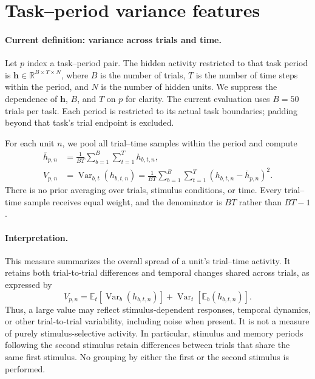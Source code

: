 \documentclass{article}
\begin{document}
\section{Task--period variance features}
\label{sec:task-period-variance}
\paragraph{Current definition: variance across trials and time.}
Let $p$ index a task--period pair. The hidden activity restricted to that
task period is $\mathbf{h}\in\mathbb{R}^{B\times T\times N}$, where $B$
is the number of trials, $T$ is the number of time steps within the period,
and $N$ is the number of hidden units. We suppress the dependence of
$\mathbf{h}$, $B$, and $T$ on $p$ for clarity. The current evaluation uses
$B=50$ trials per task. Each period is restricted to its actual task
boundaries; padding beyond that task's trial endpoint is excluded.

For each unit $n$, we pool all trial--time samples within the period and
compute
\begin{align}
    \bar{h}_{p,n}
    &= \frac{1}{BT}\sum_{b=1}^{B}\sum_{t=1}^{T}h_{b,t,n}, \\
    V_{p,n}
    &= \operatorname{Var}_{b,t}(h_{b,t,n})
     = \frac{1}{BT}\sum_{b=1}^{B}\sum_{t=1}^{T}
       \left(h_{b,t,n}-\bar{h}_{p,n}\right)^2.
    \label{eq:trial_time_variance}
\end{align}
There is no prior averaging over trials, stimulus conditions, or time.
Every trial--time sample receives equal weight, and the denominator is
$BT$ rather than $BT-1$.

\paragraph{Interpretation.}
This measure summarizes the overall spread of a unit's trial--time
activity. It retains both trial-to-trial differences and temporal changes
shared across trials, as expressed by
\begin{equation}
    V_{p,n}
    = \mathbb{E}_{t}\!\left[\operatorname{Var}_{b}(h_{b,t,n})\right]
    + \operatorname{Var}_{t}\!\left[\mathbb{E}_{b}(h_{b,t,n})\right].
\end{equation}
Thus, a large value may reflect stimulus-dependent responses, temporal
dynamics, or other trial-to-trial variability, including noise when present.
It is not a measure of purely stimulus-selective activity. In particular,
stimulus and memory periods following the second stimulus retain differences
between trials that share the same first stimulus. No grouping by either
the first or the second stimulus is performed.
\end{document}
